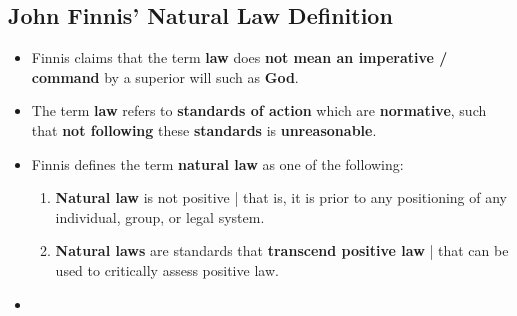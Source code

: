 \documentclass[16pt]{article}
\begin{document}
    \subsection*{John Finnis' Natural Law Definition}
    \begin{itemize}
        \item Finnis claims that the term \textbf{law} does \textbf{not mean an imperative / command} by a superior will such as \textbf{God}.
        \item The term \textbf{law} refers to \textbf{standards of action} which are \textbf{normative}, such that \textbf{not following} these \textbf{standards} is \textbf{unreasonable}.
        \item Finnis defines the term \textbf{natural law} as one of the following:
        \begin{enumerate}
            \item \textbf{Natural law} is not positive | that is, it is prior to any positioning of any individual, group, or legal system.
            \item \textbf{Natural laws} are standards that \textbf{transcend positive law} | that can be used to critically assess positive law.
        \end{enumerate}
        \item 
    \end{itemize}
\end{document}
